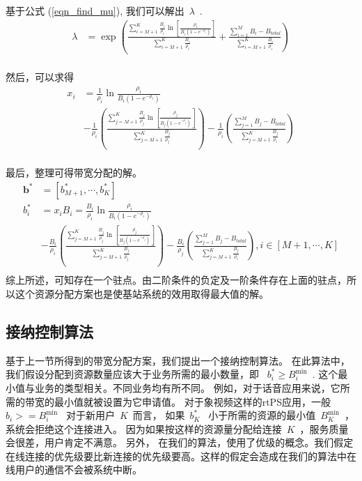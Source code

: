 基于公式 (\ref{eqn_find_mu}), 我们可以解出~$\lambda$~.
\begin{equation*}
\begin{split}
\lambda &= \exp \left( \frac{\sum_{i=M+1}^K \frac{B_i}{\rho_i} \ln \left[ \frac{\rho_i}{B_i(1-e^{-\rho_i})} \right]
}{\sum_{i=M+1}^K \frac{B_i}{\rho_i}} \right.
+ \left. \frac{ 
\sum_{i=1}^M B_i - B_{total}}{\sum_{i=M+1}^K \frac{B_i}{\rho_i}} \right)\\
\end{split}
\end{equation*}

然后，可以求得
%
\begin{equation}
\begin{split}
x_i & = \frac{1}{\rho_i} \ln \frac{\rho_i}{B_i(1-e^{-\rho_i})} \\
&-\frac{1}{\rho_i}\left( \frac{\sum_{j=M+1}^K \frac{B_j}{\rho_j} \ln \left[\frac{\rho_j}{B_j(1-e^{-\rho_j})}\right] 
}{\sum_{j=M+1}^K \frac{B_j}{\rho_j}} \right)
-\frac{1}{\rho_i}\left( \frac{ 
\sum_{j=1}^M B_j - B_{total}}{\sum_{j=M+1}^K \frac{B_j}{\rho_i}} \right) \\
\end{split}
\end{equation}
%

最后，整理可得带宽分配的解。
%
\begin{equation}
\begin{split}
\mathbf{b^*}& = [b^*_{M+1}, \cdots, b^*_{K}]\\
b_i^* & = x_iB_i = \frac{B_i}{\rho_i} \ln \frac{\rho_i}{B_i(1-e^{-\rho_i})} \\
&-\frac{B_i}{\rho_i}\left( \frac{\sum_{j=M+1}^K \frac{B_j}{\rho_j} \ln \left[\frac{\rho_j}{B_j(1-e^{-\rho_j})}\right] 
}{\sum_{j=M+1}^K \frac{B_j}{\rho_j}} \right)
 -\frac{B_i}{\rho_j}\left( \frac{ 
\sum_{j=1}^M B_j - B_{total}}{\sum_{j=M+1}^K \frac{B_j}{\rho_i}} \right), i \in [M+1, \cdots, K] \\
\end{split}
\label{eqn:chap_cacop:b_i_bw}
\end{equation}
综上所述，可知存在一个驻点。由二阶条件的负定及一阶条件存在上面的驻点，所以这个资源分配方案也是使基站系统的效用取得最大值的解。
%
\subsection{接纳控制算法}
\label{sec_alg}

基于上一节所得到的带宽分配方案，我们提出一个接纳控制算法。
在此算法中，我们假设分配到资源数量应该大于业务所需的最小数量，即
~$b_i^* \ge B_i^{\min}$~. 
这个最小值与业务的类型相关。不同业务均有所不同。
例如，对于话音应用来说，它所需的带宽的最小值就被设置为它申请值。
对于象视频这样的rtPS应用，一般~$b_i>=B_i^{\min}$~
对于新用户~$K$~而言，
如果~$b_K^*$~ 小于所需的资源的最小值~$B_K^{\min}$~，系统会拒绝这个连接进入。
因为如果按这样的资源量分配给连接~$K$~，服务质量会很差，用户肯定不满意。
另外，
在我们的算法，使用了优级的概念。我们假定在线连接的优先级要比新连接的优先级要高。这样的假定会造成在我们的算法中在线用户的通信不会被系统中断。


